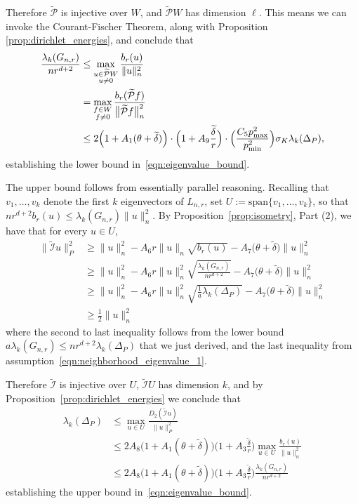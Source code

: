 \documentclass[twoside]{article}
\newcommand{\1}{\mathbf{1}}
\newcommand{\Lap}{L}
\newcommand{\mc}[1]{\mathcal{#1}}
\newcommand{\wt}[1]{\widetilde{#1}}
\theoremstyle{definition}
\theoremstyle{remark}
\begin{document}
Therefore $\wt{\mc{P}}$ is injective over $W$, and $\wt{\mc{P}}W$ has dimension $\ell$. This means we can invoke the Courant-Fischer Theorem, along with Proposition \ref{prop:dirichlet_energies}, and conclude that
\begin{align*}
\frac{\lambda_k(G_{n,r})}{nr^{d + 2}} & \leq \max_{\substack{u \in \wt{\mc{P}}W \\ u \neq 0} } \frac{b_r(u)}{\|u\|_{n}^2} \\
& = \max_{\substack{f \in W \\ f \neq 0} } \frac{b_r(\wt{\mc{P}}f)}{\bigl\|\wt{\mc{P}}f\bigr\|_{n}^2} \\
& \leq 2\Bigl(1 + A_1(\theta + \wt{\delta})\Bigr) \cdot \Bigl(1 + A_9\frac{\wt{\delta}}{r}\Bigr) \cdot \Bigl(\frac{C_5 p_{\max}^2}{p_{\min}^2}\Bigr) \sigma_K \lambda_{k}(\Delta_P),
\end{align*}
establishing the lower bound in~\eqref{eqn:eigenvalue_bound}.

The upper bound follows from essentially parallel reasoning. Recalling that $v_1,\ldots,v_k$ denote the first $k$ eigenvectors of $\Lap_{n,r}$, set $U := \mathrm{span}\{v_1,\ldots,v_k\}$, so that $nr^{d + 2} b_r(u) \leq \lambda_k(G_{n,r}) \|u\|_n^2$. By Proposition~\ref{prop:isometry}, Part (2), we have that for every $u \in U$,
\begin{align*}
\bigl\|\wt{\mc{I}}u\bigr\|_{P}^2 & \geq \|u\|_n^2 - A_6 r \|u\|_n \sqrt{b_r(u)} - A_7\bigl(\theta + \wt{\delta}\bigr)\|u\|_n^2 \\
& \geq \|u\|_n^2 - A_6 r \|u\|_n^2 \sqrt{\frac{\lambda_{k}(G_{n,r})}{nr^{d + 2}}} - A_7\bigl(\theta + \wt{\delta}\bigr)\|u\|_n^2 \\
& \geq \|u\|_n^2 - A_6 r \|u\|_n^2 \sqrt{\frac{1}{a}\lambda_k(\Delta_P)} - A_7\bigl(\theta + \wt{\delta}\bigr)\|u\|_n^2 \\
& \geq \frac{1}{2}\|u\|_n^2
\end{align*}
where the second to last inequality follows from the lower bound $a \lambda_k(G_{n,r}) \leq nr^{d + 2}\lambda_k(\Delta_P)$ that we just derived, and the last inequality from assumption~\eqref{eqn:neighborhood_eigenvalue_1}.

Therefore $\wt{\mc{I}}$ is injective over $U$, $\wt{\mc{I}}U$ has dimension $k$, and by Proposition~\ref{prop:dirichlet_energies} we conclude that
\begin{align*}
\lambda_k(\Delta_P) & \leq \max_{u \in U} \frac{D_2(\wt{\mc{I}}u)}{\|u\|_P^2} \\
& \leq 2A_8\biggl(1 + A_1(\theta + \wt{\delta})\biggr) \biggl(1 + A_3 \frac{\wt{\delta}}{r}\biggr)\max_{u \in U} \frac{b_r(u)}{\|u\|_n^2} \\
& \leq 2A_8\biggl(1 + A_1(\theta + \wt{\delta})\biggr) \biggl(1 + A_3\frac{\wt{\delta}}{r}\biggr) \frac{\lambda_k(G_{n,r})}{nr^{d + 2}}
\end{align*}
establishing the upper bound in~\eqref{eqn:eigenvalue_bound}.
\end{document}
